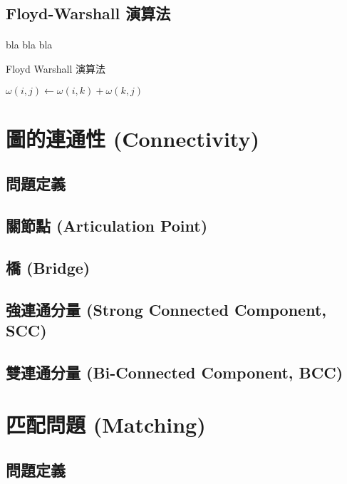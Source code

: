 \documentclass[12pt,a4paper,oneside]{report}
\begin{document}
\begin{CJK}{UTF8}{bkai}
\subsection{Floyd-Warshall 演算法}
\paragraph{}bla bla bla
\begin{algorithm}
\label{algo-floyd-warshall}
\caption{Floyd Warshall 演算法}
\begin{algorithmic}[1]
          \State $\omega{(i,j)}\gets{\omega{(i,k)}+\omega{(k,j)}}$
        \EndIf
      \EndFor
    \EndFor
  \EndFor
\EndProcedure
\end{algorithmic}
\end{algorithm}

\section{圖的連通性 (Connectivity)}
\subsection{問題定義}
\subsection{關節點 (Articulation Point)}
\subsection{橋 (Bridge)}
\subsection{強連通分量 (Strong Connected Component, SCC)}
\subsection{雙連通分量 (Bi-Connected Component, BCC)}

\section{匹配問題 (Matching)}
\subsection{問題定義}


\end{CJK}
\end{document}
